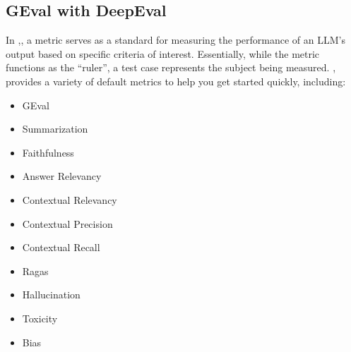 \documentclass[letterpaper,11pt,english]{sphinxmanual}
\begin{document}
\subsection{G\sphinxhyphen{}Eval with DeepEval}
\label{\detokenize{evaluation:g-eval-with-deepeval}}
\sphinxAtStartPar
In ,, a metric serves as a standard for measuring the performance
of an LLM’s output based on specific criteria of interest. Essentially,
while the metric functions as the “ruler”, a test case represents the
subject being measured. , provides a variety of default metrics
to help you get started quickly, including:
\begin{itemize}
\item {} 
\sphinxAtStartPar
G\sphinxhyphen{}Eval

\item {} 
\sphinxAtStartPar
Summarization

\item {} 
\sphinxAtStartPar
Faithfulness

\item {} 
\sphinxAtStartPar
Answer Relevancy

\item {} 
\sphinxAtStartPar
Contextual Relevancy

\item {} 
\sphinxAtStartPar
Contextual Precision

\item {} 
\sphinxAtStartPar
Contextual Recall

\item {} 
\sphinxAtStartPar
Ragas

\item {} 
\sphinxAtStartPar
Hallucination

\item {} 
\sphinxAtStartPar
Toxicity

\item {} 
\sphinxAtStartPar
Bias

\end{itemize}
\end{document}
